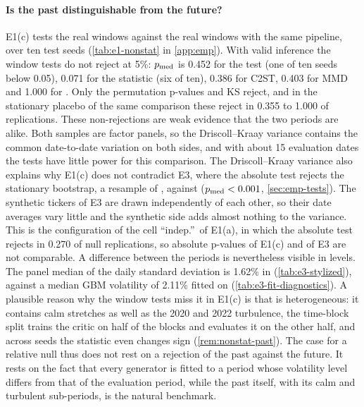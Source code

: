 \paragraph{Is the past distinguishable from the future?}
E1(c) tests the real \TEST{} windows against the real \TRAIN{} windows with the same pipeline,
over ten test seeds (\cref{tab:e1-nonstat} in \cref{app:emp}). With valid inference the window
tests do not reject at 5\%: $p_{\mathrm{med}}$ is 0.452 for the \WC{} test (one of ten seeds below 0.05),
0.071 for the \LRC{} statistic (six of ten), 0.386 for C2ST, 0.403 for MMD and 1.000 for
\SigMMD{}. Only the permutation p-values and KS reject, and in the stationary placebo of the same
comparison these reject in 0.355 to 1.000 of replications. These non-rejections are weak evidence
that the two periods are alike. Both samples are factor panels, so the Driscoll--Kraay variance
contains the common date-to-date variation on both sides, and with about 15 \TEST{} evaluation
dates the tests have little power for this comparison. The Driscoll--Kraay variance also
explains why E1(c) does not contradict E3, where the absolute \WC{} test rejects the stationary
bootstrap, a resample of \TRAIN{}, against \TEST{} ($p_{\mathrm{med}}<0.001$, \cref{sec:emp-tests}). The synthetic tickers of E3 are drawn
independently of each other, so their date averages vary little and the synthetic side adds
almost nothing to the variance. This is the configuration of the cell ``indep.''\ of E1(a), in
which the absolute test rejects in 0.270 of null replications, so absolute p-values of E1(c) and
of E3 are not comparable. A difference between the periods is nevertheless visible in levels. The panel median of the daily standard
deviation is 1.62\% in \TEST{} (\cref{tab:e3-stylized}), against a median GBM volatility of
2.11\% fitted on \TRAIN{} (\cref{tab:e3-fit-diagnostics}). A plausible reason why the window
tests miss it in E1(c) is that \TRAIN{} is heterogeneous: it contains calm stretches as well as
the 2020 and 2022 turbulence, the time-block split trains the critic on half of the \TRAIN{}
blocks and evaluates it on the other half, and across seeds the \WC{} statistic even changes
sign (\cref{rem:nonstat-past}). The case for a relative null thus does not rest on a
rejection of the past against the future. It rests on the fact that every generator is fitted
to a period whose volatility level differs from that of the evaluation period, while the past
itself, with its calm and turbulent sub-periods, is the natural benchmark.

